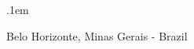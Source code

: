 \begin{center}
    
    \fontsize{40pt}{0pt}
    \openup .1em
    \fontsize{40pt}{0pt}
  \end{center}

  \normalsize{{\Large{}} Belo Horizonte, Minas Gerais - Brazil}